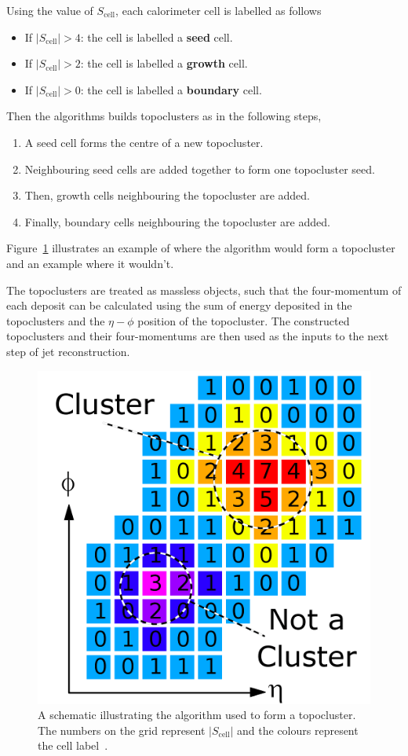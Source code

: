 \noindent
Using the value of $S_{\text{cell}}$, each calorimeter cell is labelled as follows
\begin{itemize}
\item If $|S_{\text{cell}}| > 4$: the cell is labelled a \textbf{seed} cell.
\item If $|S_{\text{cell}}| > 2$: the cell is labelled a \textbf{growth} cell.
\item If $|S_{\text{cell}}| > 0$: the cell is labelled a \textbf{boundary} cell.
\end{itemize}
Then the algorithms builds topoclusters as in the following steps,
\begin{enumerate}
\item A seed cell forms the centre of a new topocluster.
\item Neighbouring seed cells are added together to form one topocluster seed.
\item Then, growth cells neighbouring the topocluster are added.
\item Finally, boundary cells neighbouring the topocluster are added.
\end{enumerate}
Figure~\ref{fig:obj-topo_schem} illustrates an example of where the algorithm would form a topocluster and an example where it wouldn't.

The topoclusters are treated as massless objects,
such that the four-momentum of each deposit can be calculated using the sum of energy deposited in the topoclusters
and the $\eta-\phi$ position of the topocluster.
The constructed topoclusters and their four-momentums are then used as the inputs to the next step of jet reconstruction.

\begin{figure}[!hbt]
  \begin{center}
    \includegraphics[width=0.7\linewidth, angle=0]{figs/Objects/topo_schem.png}
  \end{center}
  \caption[A schematic illustrating the algorithm used to form a topocluster. The numbers on the grid represent $|S_{\text{cell}}|$ and the colours represent the cell label.]
          {A schematic illustrating the algorithm used to form a topocluster. The numbers on the grid represent $|S_{\text{cell}}|$ and the colours represent the cell label~\cite{det-magnet_fig}.}
  \label{fig:obj-topo_schem}
\end{figure}

